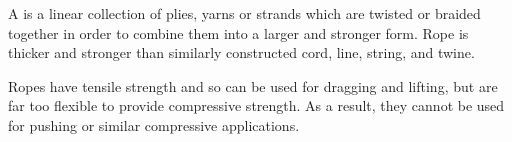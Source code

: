 \begin{module}[id=rope]
\begin{definition}
  A  is a linear collection of plies, yarns or strands which are twisted or
  braided together in order to combine them into a larger and stronger form. Rope is
  thicker and stronger than similarly constructed cord, line, string, and twine.
\end{definition}

\begin{assertion}[type=observation]
  Ropes have tensile strength and so can be used for dragging and lifting, but are far too
  flexible to provide compressive strength. As a result, they cannot be used for pushing
  or similar compressive applications.
\end{assertion}
\end{module}

